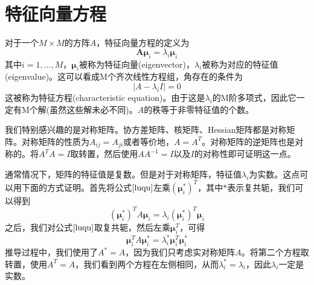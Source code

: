 \section{特征向量方程}
对于一个$M\times M$的方阵$A$，特征向量方程的定义为
\begin{equation}
\label{luqu}
	\boldsymbol{A}\boldsymbol{\mu}_i=\lambda_i\boldsymbol{\mu}_i
\end{equation}
其中$i=1,\dots,M$，$\boldsymbol{\mu}_i$被称为特征向量(eigenvector)，$\lambda_i$被称为对应的特征值(eigenvalue)。这可以看成M个齐次线性方程组，角存在的条件为
\begin{equation}
	|A-\lambda_i I|=0
\end{equation}
这被称为特征方程(characteristic equation)。由于这是$\lambda_i$的M阶多项式，因此它一定有M个解(虽然这些解未必不同)。$A$的秩等于非零特征值的个数。

我们特别感兴趣的是对称矩阵。协方差矩阵、核矩阵、Hessian矩阵都是对称矩阵。对称矩阵的性质为$A_{ij}=A_{ji}$或者等价地，$A=A^T$。对称矩阵的逆矩阵也是对称的。将$A^TA=I$取转置，然后使用$AA^{-1}=I$以及$I$的对称性即可证明这一点。

通常情况下，矩阵的特征值是复数。但是对于对称矩阵，特征值$\lambda_i$为实数。这点可以用下面的方式证明。首先将公式$\ref{luqu}$左乘$(\boldsymbol{\mu}_i^*)^T$，其中$*$表示复共轭，我们可以得到 
\begin{equation}
	(\boldsymbol{\mu}_i^*)^TA\boldsymbol{\mu}_i=\lambda_i(\boldsymbol{\mu}_i^*)^T\boldsymbol{\mu}_i
\end{equation}
之后，我们对公式$\ref{luqu}$取复共轭，然后左乘$\boldsymbol{\mu}_i^T$，可得
\begin{equation}
	\boldsymbol{\mu}_i^TA\boldsymbol{\mu}_i^*=\lambda_i^*\boldsymbol{\mu}_i^T\boldsymbol{\mu}_i^*
\end{equation}
推导过程中，我们使用了$A^*=A$，因为我们只考虑实对称矩阵$A$。将第二个方程取转置，使用$A^T=A$，我们看到两个方程在左侧相同，从而$\lambda_i^*=\lambda_i$，因此$\lambda_i$一定是实数。


